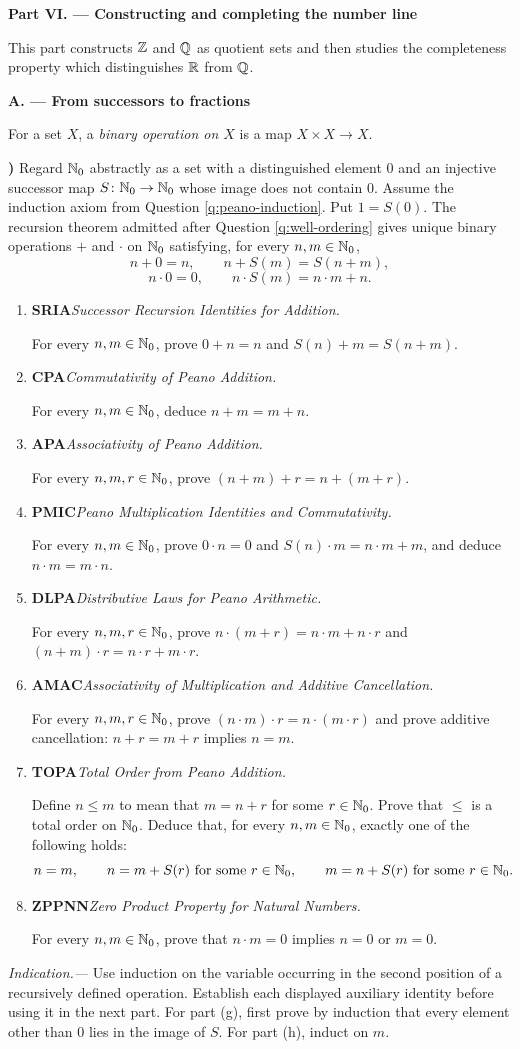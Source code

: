 \documentclass[10pt,a4paper]{article}
\newcounter{examquestion}
\newcommand{\examquestion}[1]{%
  \Needspace{5\baselineskip}%
  \refstepcounter{examquestion}%
  \par\addvspace{0.8\baselineskip}%
  \noindent\textbf{\theexamquestion)}\enspace #1\par
}
\newenvironment{subquestions}
  {\begin{enumerate}[label=\alph*),leftmargin=2.1em]}
  {\end{enumerate}}
\newcommand{\nameditem}[2]{%
  \textbf{\textsf{#1}}\enspace\emph{#2.}\enspace
}
\newcommand{\indication}[1]{%
  \par\smallskip\noindent\emph{Indication.---} #1\par
}
\newcommand{\exampart}[2]{%
  \clearpage
  \markboth{Part #1}{}
  \begin{center}
    {\large\bfseries Part #1. --- #2}
  \end{center}
}
\newcommand{\subpart}[1]{%
  \begin{center}
    \textbf{#1}
  \end{center}
}
\begin{document}
\exampart{VI}{Constructing and completing the number line}

This part constructs $\mathbb{Z}$ and $\mathbb{Q}$ as quotient sets and then studies the
completeness property which distinguishes $\mathbb{R}$ from $\mathbb{Q}$.

\subpart{A. --- From successors to fractions}

For a set $X$, a \emph{binary operation on $X$} is a map
$X\times X\to X$.

\examquestion{\label{q:peano-arithmetic}
Regard $\mathbb{N}_0$ abstractly as a set with a distinguished element $0$ and an
injective successor map $S\colon\mathbb{N}_0\to\mathbb{N}_0$ whose image does not contain
$0$.  Assume the induction axiom from Question \ref{q:peano-induction}.
Put $1=S(0)$.  The recursion theorem admitted after Question
\ref{q:well-ordering} gives unique binary operations $+$ and $\cdot$ on
$\mathbb{N}_0$ satisfying, for every $n,m\in\mathbb{N}_0$,
\[
  n+0=n,\qquad n+S(m)=S(n+m),
\]
\[
  n\cdot0=0,\qquad n\cdot S(m)=n\cdot m+n.
\]
\begin{subquestions}
  \item \nameditem{SRIA}{Successor Recursion Identities for Addition}
  For every $n,m\in\mathbb{N}_0$, prove
  $0+n=n$ and $S(n)+m=S(n+m)$.
  \item \nameditem{CPA}{Commutativity of Peano Addition}
  For every $n,m\in\mathbb{N}_0$, deduce $n+m=m+n$.
  \item \nameditem{APA}{Associativity of Peano Addition}
  For every $n,m,r\in\mathbb{N}_0$, prove
  $(n+m)+r=n+(m+r)$.
  \item \nameditem{PMIC}{Peano Multiplication Identities and Commutativity}
  For every $n,m\in\mathbb{N}_0$, prove
  $0\cdot n=0$ and $S(n)\cdot m=n\cdot m+m$, and deduce
  $n\cdot m=m\cdot n$.
  \item \nameditem{DLPA}{Distributive Laws for Peano Arithmetic}
  For every $n,m,r\in\mathbb{N}_0$, prove
  $n\cdot(m+r)=n\cdot m+n\cdot r$ and
  $(n+m)\cdot r=n\cdot r+m\cdot r$.
  \item \nameditem{AMAC}{Associativity of Multiplication and Additive Cancellation}
  For every $n,m,r\in\mathbb{N}_0$, prove
  $(n\cdot m)\cdot r=n\cdot(m\cdot r)$ and prove additive cancellation:
  $n+r=m+r$ implies $n=m$.
  \item \nameditem{TOPA}{Total Order from Peano Addition}
  Define $n\leq m$ to mean that $m=n+r$ for some $r\in\mathbb{N}_0$.
  Prove that $\leq$ is a total order on $\mathbb{N}_0$.  Deduce that, for every
  $n,m\in\mathbb{N}_0$, exactly one of the following holds:
  \[
    n=m,\qquad n=m+S(r)\text{ for some }r\in\mathbb{N}_0,\qquad
    m=n+S(r)\text{ for some }r\in\mathbb{N}_0.
  \]
  \item \nameditem{ZPPNN}{Zero Product Property for Natural Numbers}
  For every $n,m\in\mathbb{N}_0$, prove that $n\cdot m=0$ implies $n=0$ or
  $m=0$.
\end{subquestions}
\indication{Use induction on the variable occurring in the second position
of a recursively defined operation.  Establish each displayed auxiliary
identity before using it in the next part.  For part (g), first prove by
induction that every element other than $0$ lies in the image of $S$.  For
part (h), induct on $m$.}}
\end{document}
